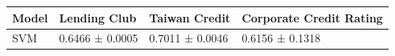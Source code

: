 \begin{tabular}{llll}
\toprule
Model & Lending Club & Taiwan Credit & Corporate Credit Rating \\
\midrule
SVM & 0.6466 ± 0.0005 & 0.7011 ± 0.0046 & 0.6156 ± 0.1318 \\
\bottomrule
\end{tabular}
